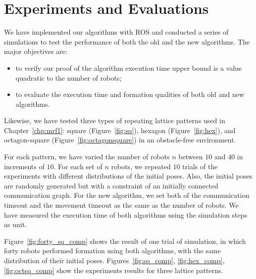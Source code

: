 \section{Experiments and Evaluations}
\label{sec:exp}
We have implemented our algorithms with ROS and conducted a series of simulations to test the performance of both the old and the new algorithms. 
%
The major objectives are:
\begin{itemize}
\item to verify our proof of the algorithm execution time upper bound is a value quadratic to the number of robots;
\item to evaluate the execution time and formation qualities of both old and new algorithms.
\end{itemize} 
 
 
Likewise, we have tested three types of repeating lattice patterns used in Chapter~\ref{chp:mrf1}:
square (Figure~\ref{fig:sq}), hexagon (Figure~\ref{fig:hex}), and octagon-square (Figure~\ref{fig:octagonsquare}) in an obstacle-free environment.
  
  
For each pattern, we have varied the number of robots $n$ between $10$ and $40$ in increments of $10$. 
%
For each set of $n$ robots, we repeated $10$ trials of the experiments with different distributions
of the initial poses. 
%
Also, the initial poses are randomly generated but with a constraint of an initially connected communication graph. 
%
For the new algorithm, we set both of the communication timeout and the movement timeout as the same as the number of robots. 
%
We have measured the execution time of both algorithms using the simulation steps as unit. 

Figure~\ref{fig:forty_sq_comp} shows the result of one trial of simulation, in which forty robots performed formation using both algorithms, with the same distribution of their initial poses.
%
Figures~\ref{fig:sq_comp}, \ref{fig:hex_comp}, \ref{fig:octsq_comp} show the experiments results for three lattice patterns.


